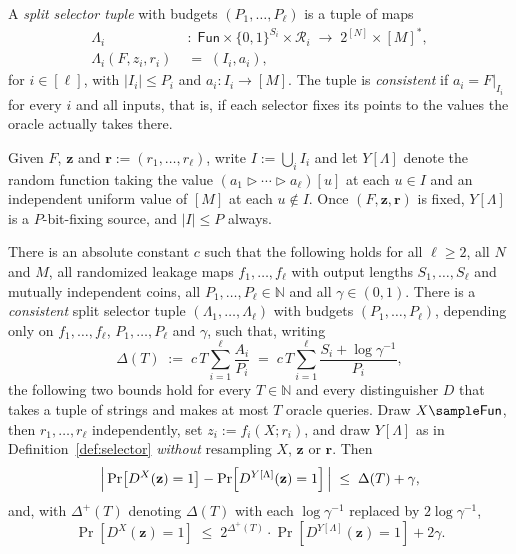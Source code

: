 \documentclass{conjura-conjecture}
\newcommand{\Fun}{\mathsf{Fun}}
\newcommand{\Prob}[1]{\Pr\!\left[#1\right]}
\newcommand{\bits}{\{0,1\}}
\newcommand{\vz}{\mathbf{z}}
\newcommand{\vr}{\mathbf{r}}
\newcommand{\merge}{\mathbin{\triangleright}}
\begin{document}
\begin{definition}\label{def:selector}
A \emph{split selector tuple} with budgets $(P_1,\dots,P_\ell)$ is a tuple
of maps
\[
\begin{aligned}
  \Lambda_i &\;:\; \Fun \times \bits^{S_i} \times \mathcal{R}_i
  \;\longrightarrow\; 2^{[N]} \times [M]^{*}, \\
  \Lambda_i(F,z_i,r_i) &\;=\; (I_i, a_i),
\end{aligned}
\]
for $i \in [\ell]$, with $|I_i| \le P_i$ and $a_i : I_i \to [M]$. The
tuple is \emph{consistent} if $a_i = F|_{I_i}$ for every $i$ and all
inputs, that is, if each selector fixes its points to the values the
oracle actually takes there.

Given $F$, $\vz$ and $\vr := (r_1,\dots,r_\ell)$, write
$I := \bigcup_i I_i$ and let $Y[\Lambda]$ denote the random function
taking the value $(a_1 \merge \cdots \merge a_\ell)[u]$ at each $u \in I$
and an independent uniform value of $[M]$ at each $u \notin I$. Once
$(F,\vz,\vr)$ is fixed, $Y[\Lambda]$ is a $P$-bit-fixing source, and
$|I| \le P$ always.
\end{definition}

\begin{conjecture}\label{conj:main}
There is an absolute constant $c$ such that the following holds for all
$\ell \ge 2$, all $N$ and $M$, all randomized leakage maps
$f_1,\dots,f_\ell$ with output lengths $S_1,\dots,S_\ell$ and mutually
independent coins, all $P_1,\dots,P_\ell \in \mathbb{N}$ and all
$\gamma \in (0,1)$. There is a \emph{consistent} split selector tuple
$(\Lambda_1,\dots,\Lambda_\ell)$ with budgets $(P_1,\dots,P_\ell)$,
depending only on $f_1,\dots,f_\ell$, $P_1,\dots,P_\ell$ and $\gamma$,
such that, writing
\[
  \Delta(T) \;:=\; c\,T\sum_{i=1}^{\ell}\frac{A_i}{P_i}
  \;=\; c\,T\sum_{i=1}^{\ell}\frac{S_i + \log\gamma^{-1}}{P_i} ,
\]
the following two bounds hold for every $T \in \mathbb{N}$ and every
distinguisher $D$ that takes a tuple of strings and makes at most $T$
oracle queries. Draw $X \sample \Fun$, then $r_1,\dots,r_\ell$
independently, set $z_i := f_i(X;r_i)$, and draw $Y[\Lambda]$ as in
Definition~\ref{def:selector} \emph{without} resampling $X$, $\vz$ or
$\vr$. Then
\[
  \Bigl|\, \Prob{D^{X}(\vz) = 1} - \Prob{D^{Y[\Lambda]}(\vz) = 1}\,\Bigr|
  \;\le\; \Delta(T) + \gamma ,
\]
and, with $\Delta^{+}(T)$ denoting $\Delta(T)$ with each
$\log\gamma^{-1}$ replaced by $2\log\gamma^{-1}$,
\[
  \Prob{D^{X}(\vz) = 1}
  \;\le\; 2^{\Delta^{+}(T)}\cdot\Prob{D^{Y[\Lambda]}(\vz) = 1} + 2\gamma .
\]
\end{conjecture}
\end{document}

